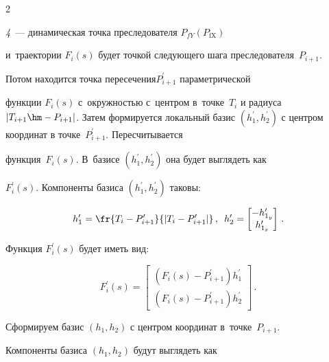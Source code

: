 \begin{multicols}{2}
{{{\textit{4}~--- динамическая точка преследователя $P_{fY} (P_{\mathrm{fX}})$


}}}





\vspace*{9pt}








\noindent


 и~траектории $F_i(s)$ будет точкой следующего шага преследователя~$P_{i+1}$. 


Потом находится точка пересечения$P^\prime_{i+1}$ параметрической 


функции $F_i(s)$ с~окруж\-ностью с~цент\-ром в~точ\-ке~$T_i$ и радиуса $\vert 


T_{i+1}\hm- P_{i+1}\vert$. Затем формируется локальный базис $(h_1^\prime, 


h_2^\prime)$ с центром координат в точке~$P^\prime_{i+1}$. Пересчитывается 


функция~$F_i(s)$. В~базисе $(h_1^\prime, h_2^\prime)$ она будет выглядеть как 


$F^\prime_i(s)$. Компоненты базиса $(h_1^\prime, h_2^\prime)$ таковы: 


$$


h_1^\prime= \fr{T_i-P^\prime_{i+1}}{\vert T_i -P^\prime_{i+1}\vert}\,,\enskip


h_2^\prime= \begin{bmatrix}


-h_{1_y}^\prime\\ h^\prime_{1_x}


\end{bmatrix}\,.


$$


Функция $F_i^\prime(s)$ будет иметь вид:


$$


F^\prime_i(s)= \begin{bmatrix}


\left( F_i(s)-P^\prime_{i+1}\right) h_1^\prime\\[3pt]


\left( F_i(s) -P^\prime_{i+1}\right) h_2^\prime


\end{bmatrix}\,.


$$


Сформируем базис $(h_1, h_2)$ с центром координат в~точке~$P_{i+1}$. 


Компоненты базиса $(h_1, h_2)$ будут выглядеть как 



\end{multicols}
